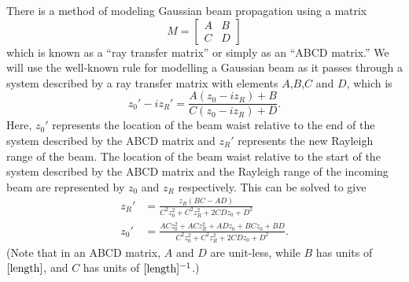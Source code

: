 
There is a method of modeling Gaussian beam propagation using a matrix
\begin{equation}
M=\begin{bmatrix}A&B \\C&D\end{bmatrix}
\end{equation}
which is known as a ``ray transfer matrix'' or simply as an ``ABCD matrix.'' We will use the well-known rule \cite{BYUOpticsBook,lasersMilonniEberly} for modelling a Gaussian beam as it passes through a system described by a ray transfer matrix with elements $A$,$B$,$C$ and $D$, which is 
\begin{equation} \label{ABCDlawforGaussianBeams}
z_0'-iz_R'=\frac{A(z_0-iz_R)+B}{C(z_0-iz_R)+D}.
\end{equation}
Here, $z_0'$ represents the location of the beam waist relative to the end of the system described by the ABCD matrix and $z_R'$ represents the new Rayleigh range of the beam. The location of the beam waist relative to the start of the system described by the ABCD matrix and the Rayleigh range of the incoming beam are represented by $z_0$ and $z_R$ respectively.
This can be solved to give 
\begin{align}
z_R' &= \frac{ z_R (BC-AD)}{C^2z_0^2+C^2z_R^2+2 C D z_0 + D^2} \\
z_0' &=\frac{AC z_0^2+ACz_R^2+ADz_0+BCz_0+BD}{C^2z_0^2+C^2z_R^2+2 C D z_0 + D^2}.
\end{align}
(Note that in an ABCD matrix, $A$ and $D$ are unit-less, while $B$ has units of $[\textnormal{length}]$, and $C$ has units of $[\textnormal{length}]^{-1}$.)


